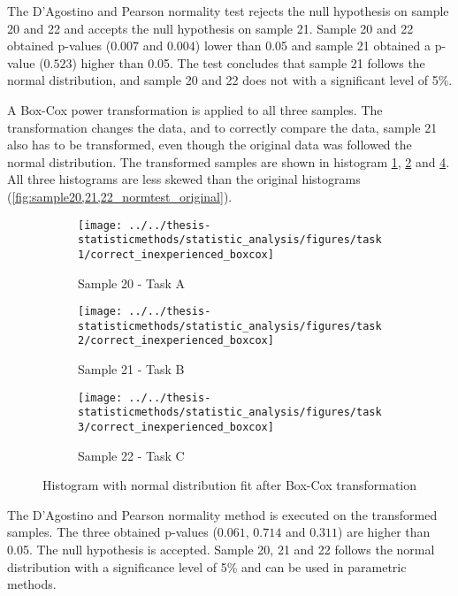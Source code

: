 The D'Agostino and Pearson normality test rejects the null hypothesis on sample 20 and 22 and accepts the null hypothesis on sample 21. Sample 20 and 22 obtained p-values ($0.007$ and $0.004$) lower than 0.05 and sample 21 obtained a p-value ($0.523$) higher than 0.05. The test concludes that sample 21 follows the normal distribution, and sample 20 and 22 does not with a significant level of 5\%. 

A Box-Cox power transformation is applied to all three samples. The transformation changes the data, and to correctly compare the data, sample 21 also has to be transformed, even though the original data was followed the normal distribution. The transformed samples are shown in histogram \ref{fig:correctinexperiencedboxcox_task1}, \ref{fig:correctinexperiencedboxcox_task2} and \ref{fig:correctinexperiencedboxcox_task3}. All three histograms are less skewed than the original histograms (\ref{fig:sample20,21,22_normtest_original}).

\begin{figure}[H]
	\centering
	\begin{subfigure}[b]{0.32\textwidth}
		\centering
		\texttt{[image: ../../thesis-statisticmethods/statistic\_analysis/figures/task1/correct\_inexperienced\_boxcox]}
		\caption{Sample 20 - Task A}
		\label{fig:correctinexperiencedboxcox_task1}
	\end{subfigure}
	\begin{subfigure}[b]{0.32\textwidth}
		\centering
		\texttt{[image: ../../thesis-statisticmethods/statistic\_analysis/figures/task2/correct\_inexperienced\_boxcox]}
		\caption{Sample 21 - Task B}
		\label{fig:correctinexperiencedboxcox_task2}
	\end{subfigure}
	\begin{subfigure}[b]{0.32\textwidth}
		\centering
		\texttt{[image: ../../thesis-statisticmethods/statistic\_analysis/figures/task3/correct\_inexperienced\_boxcox]}
		\caption{Sample 22 - Task C}
		\label{fig:correctinexperiencedboxcox_task3}
	\end{subfigure}
	\caption{Histogram with normal distribution fit after Box-Cox transformation}
\end{figure}

The D'Agostino and Pearson normality method is executed on the transformed samples. The three obtained p-values ($0.061$, $0.714$ and $0.311$) are higher than 0.05. The null hypothesis is accepted. Sample 20, 21 and 22 follows the normal distribution with a significance level of 5\% and can be used in parametric methods.  

